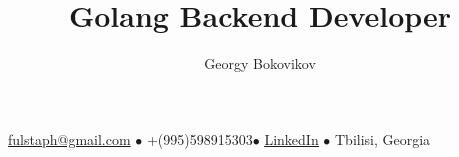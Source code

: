 \documentclass[a4paper,12pt]{article} \raggedright
\makeatletter
\renewcommand{\maketitle}{
    {\Large\bfseries\theauthor}
    \vspace{.35em}

    {\bfseries\thetitle}

    \vspace{.25em}

    \underline{fulstaph@gmail.com} {\scriptsize$\bullet$}
    +(995)598915303{\scriptsize$\bullet$}
    \href{https://www.linkedin.com/in/bokovikovg/}{\underline{LinkedIn}} {\scriptsize$\bullet$}
    Tbilisi, Georgia 
}
\makeatother
\begin{document}
\author{Georgy Bokovikov}
\title{Golang Backend Developer}
\maketitle






\end{document}
